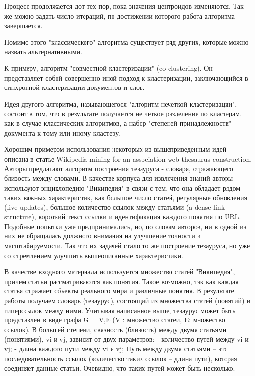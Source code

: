 Процесс продолжается дот тех пор, пока значения центроидов изменяются. Так же можно задать число 
итераций, по достижении  которого работа алгоритма завершается.

Помимо этого "классического" алгоритма существует ряд других, которые можно назвать альтернативными.

К примеру, алгоритм "совместной кластеризации" (co-clustering). Он представляет собой совершенно
иной подход к кластеризации, заключающийся в синхронной кластеризации документов и слов.

Идея другого алгоритма, называющегося "алгоритм нечеткой кластеризации", состоит в том, что в результате
получается не четкое разделение по кластерам, как в случае классических алгоритмов, а набор "степеней принадлежности"
документа к тому или иному кластеру.

Хорошим примером использования некоторых из вышеприведенным идей описана в статье
Wikipedia mining for an association web thesaurus construction. Авторы предлагают
алгоритм построения тезауруса - словаря, отражающего близость между словами.
В качестве корпуса для извлечения знаний авторы используют энциклопедию "Википедия"
в связи с тем, что она обладает рядом таких важных характеристик, как большое число 
статей, регулярные обновления (live updates), большое количество ссылок между статьями 
(a dense link structure), короткий текст ссылки и идентификация каждого понятия по URL.
Подобные попытки уже предпринимались, но, по словам авторов, ни в одной из них не обращалась
должного внимания на улучшение точности и масштабируемости. Так что их задачей стало то же 
построение тезауруса, но уже со стремлением улучшить вышеописанные характеристики.


В качестве входного материала используется множество статей "Википедия", причем статьи 
рассматриваются как понятия. Такое возможно, так как каждая статья отражает объекты реального
мира и различные понятия.
В результате работы получаем словарь (тезаурус), состоящий из множества статей (понятий) и 
гиперссылок между ними.
Учитывая написанное выше, тезаурус может быть представлен в виде графа G = {V,E}
(V : множество статей, E: множество ссылок).
В большей степени, связность (близость) между двумя статьями (понятиями), vi и vj,
зависит от двух параметров:
- количество путей между vi и vj;
- длина каждого пути между vi и vj;
Путь между двумя статьями – это последовательность ссылок (количество таких ссылок
– длина пути), которая соединяет данные статьи. Очевидно, что таких путей может 
быть несколько. 

